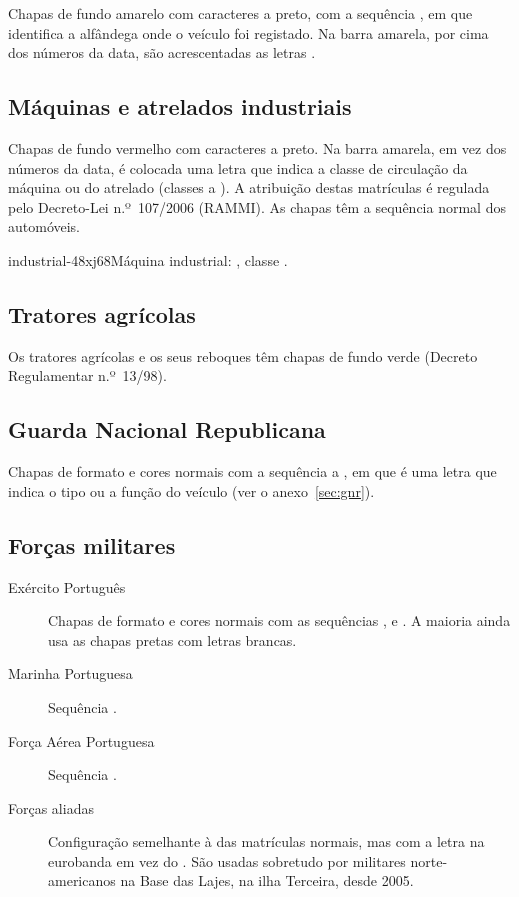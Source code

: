 Chapas de fundo amarelo com caracteres a preto, com a sequência ,
em que  identifica a alfândega onde o veículo foi registado. Na barra
amarela, por cima dos números da data, são acrescentadas as letras .



\subsection{Máquinas e atrelados industriais}

Chapas de fundo vermelho com caracteres a preto. Na barra amarela, em vez dos
números da data, é colocada uma letra que indica a classe de circulação da
máquina ou do atrelado (classes  a ). A atribuição destas matrículas é regulada pelo Decreto-Lei n.º~107/2006 (RAMMI). As chapas têm a sequência normal dos automóveis.

%
          {industrial-48xj68}{Máquina industrial: , classe .}

\subsection{Tratores agrícolas}

Os tratores agrícolas e os seus reboques têm chapas de fundo verde (Decreto
Regulamentar n.º~13/98).

\subsection{Guarda Nacional Republicana}

Chapas de formato e cores normais com a sequência  a
, em que  é uma letra que indica o tipo ou a função do
veículo (ver o anexo~\ref{sec:gnr}).

\subsection{Forças militares}

\begin{description}
  \item[Exército Português] Chapas de formato e cores normais com as sequências
    ,  e . A maioria ainda usa as
    chapas pretas com letras brancas.
  \item[Marinha Portuguesa] Sequência .
  \item[Força Aérea Portuguesa] Sequência .
  \item[Forças aliadas] Configuração semelhante à das matrículas normais, mas com
    a letra  na eurobanda em vez do . São usadas sobretudo por
    militares norte-americanos na Base das Lajes, na ilha Terceira, desde 2005.
\end{description}

